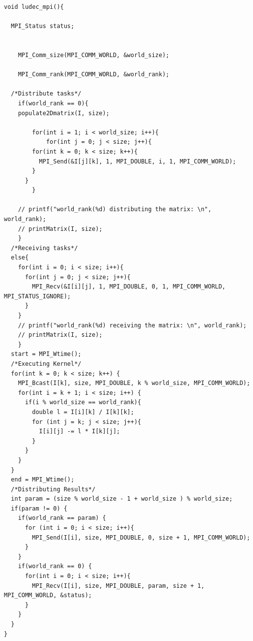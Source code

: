 \documentclass[12pt]{article}
\begin{document}
\begin{lstlisting}[style=CStyle]
void ludec_mpi(){

  MPI_Status status;


	MPI_Comm_size(MPI_COMM_WORLD, &world_size);

	MPI_Comm_rank(MPI_COMM_WORLD, &world_rank);

  /*Distribute tasks*/
	if(world_rank == 0){
    populate2Dmatrix(I, size);

		for(int i = 1; i < world_size; i++){
			for(int j = 0; j < size; j++){
        for(int k = 0; k < size; k++){
          MPI_Send(&I[j][k], 1, MPI_DOUBLE, i, 1, MPI_COMM_WORLD);
        }
      }
		}

    // printf("world_rank(%d) distributing the matrix: \n", world_rank);
    // printMatrix(I, size);
	}
  /*Receiving tasks*/
  else{
    for(int i = 0; i < size; i++){
      for(int j = 0; j < size; j++){
        MPI_Recv(&I[i][j], 1, MPI_DOUBLE, 0, 1, MPI_COMM_WORLD, MPI_STATUS_IGNORE);
      }
    }
    // printf("world_rank(%d) receiving the matrix: \n", world_rank);
    // printMatrix(I, size);
	}
  start = MPI_Wtime();
  /*Executing Kernel*/
  for(int k = 0; k < size; k++) {
    MPI_Bcast(I[k], size, MPI_DOUBLE, k % world_size, MPI_COMM_WORLD);
    for(int i = k + 1; i < size; i++) {
      if(i % world_size == world_rank){
        double l = I[i][k] / I[k][k];
        for (int j = k; j < size; j++){
          I[i][j] -= l * I[k][j];
        }
      }
    }
  }
  end = MPI_Wtime();
  /*Distributing Results*/
  int param = (size % world_size - 1 + world_size ) % world_size;
  if(param != 0) {
    if(world_rank == param) {
      for (int i = 0; i < size; i++){
        MPI_Send(I[i], size, MPI_DOUBLE, 0, size + 1, MPI_COMM_WORLD);
      }
    }
    if(world_rank == 0) {
      for(int i = 0; i < size; i++){
        MPI_Recv(I[i], size, MPI_DOUBLE, param, size + 1, MPI_COMM_WORLD, &status);
      }
    }
  }
}
\end{lstlisting}
\end{document}
